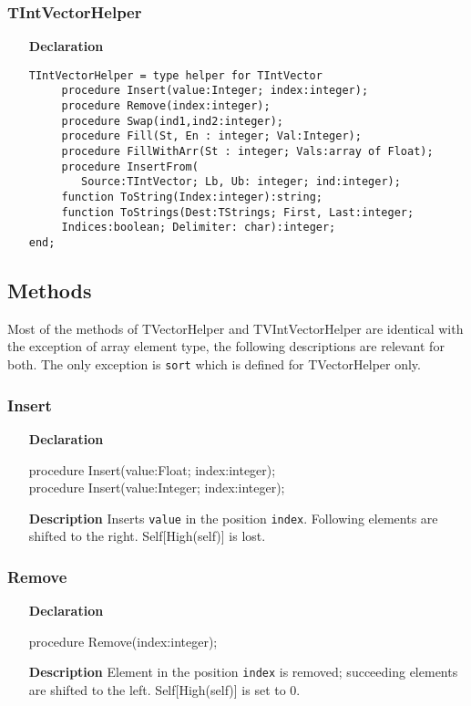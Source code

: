 \documentclass[12pt,a4paper,oneside]{report}
\newcommand{\declarationitem}[1]{\textbf{#1}}
\newcommand{\descriptiontitle}[1]{\textbf{#1}}
\newcommand{\code}[1]{\texttt{#1}}
\begin{document}
\subsubsection{TIntVectorHelper}
\begin{itemize}
	\item[\declarationitem{Declaration}\hfill]
	\begin{verbatim}
TIntVectorHelper = type helper for TIntVector
     procedure Insert(value:Integer; index:integer);
     procedure Remove(index:integer);
     procedure Swap(ind1,ind2:integer);
     procedure Fill(St, En : integer; Val:Integer);
     procedure FillWithArr(St : integer; Vals:array of Float);
     procedure InsertFrom(
     	Source:TIntVector; Lb, Ub: integer; ind:integer);
     function ToString(Index:integer):string;
     function ToStrings(Dest:TStrings; First, Last:integer;
     Indices:boolean; Delimiter: char):integer;
end;
	\end{verbatim}
\end{itemize}
\subsection{Methods}
Most of the methods of TVectorHelper and TVIntVectorHelper are identical with the exception of array element type, the following descriptions are relevant for both. The only exception is \code{sort} which is defined for TVectorHelper only.
\subsubsection{Insert}
\begin{itemize}
	\item[\declarationitem{Declaration}\hfill]
	\begin{flushleft}
     procedure Insert(value:Float; index:integer);\\ \vspace{4pt}
     procedure Insert(value:Integer; index:integer);
	\end{flushleft}
	\item[\descriptiontitle{Description}]
	Inserts \code{value} in the position \code{index}. Following elements are shifted to the right. Self[High(self)] is lost.
\end{itemize}
\subsubsection{Remove}
\begin{itemize}
	\item[\declarationitem{Declaration}\hfill]
	\begin{flushleft}
     procedure Remove(index:integer);
	\end{flushleft}
	\item[\descriptiontitle{Description}\hfill]
	Element in the position \code{index} is removed; succeeding elements are shifted to the left. Self[High(self)] is set to 0. 
\end{itemize}
\end{document}
